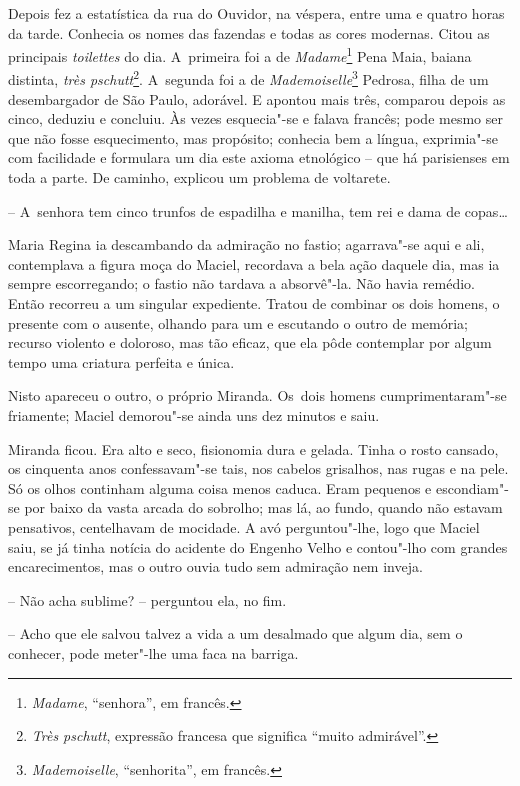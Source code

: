 Depois fez a estatística da rua do Ouvidor, na véspera, entre uma e
quatro horas da tarde. Conhecia os nomes das fazendas e todas as cores
modernas. Citou as principais \emph{toilettes} do dia. A~primeira foi a
de \emph{Madame}\footnote{\emph{Madame}, ``senhora'', em francês.} Pena
Maia, baiana distinta, \emph{très pschutt}\footnote{\emph{Très pschutt},
  expressão francesa que significa ``muito admirável''.}. A~segunda foi
a de \emph{Mademoiselle}\footnote{\emph{Mademoiselle}, ``senhorita'', em
  francês.} Pedrosa, filha de um desembargador de São Paulo, adorável. E
apontou mais três, comparou depois as cinco, deduziu e concluiu. Às
vezes esquecia"-se e falava francês; pode mesmo ser que não fosse
esquecimento, mas propósito; conhecia bem a língua, exprimia"-se com
facilidade e formulara um dia este axioma etnológico -- que há
parisienses em toda a parte. De caminho, explicou um problema de
voltarete.

-- A~senhora tem cinco trunfos de espadilha e manilha, tem rei e dama de
copas\ldots{}

Maria Regina ia descambando da admiração no fastio; agarrava"-se aqui e
ali, contemplava a figura moça do Maciel, recordava a bela ação daquele
dia, mas ia sempre escorregando; o fastio não tardava a absorvê"-la. Não
havia remédio. Então recorreu a um singular expediente. Tratou de
combinar os dois homens, o presente com o ausente, olhando para um e
escutando o outro de memória; recurso violento e doloroso, mas tão
eficaz, que ela pôde contemplar por algum tempo uma criatura perfeita e
única.

Nisto apareceu o outro, o próprio Miranda. Os~dois homens
cumprimentaram"-se friamente; Maciel demorou"-se ainda uns dez minutos e
saiu.

Miranda ficou. Era alto e seco, fisionomia dura e gelada. Tinha o rosto
cansado, os cinquenta anos confessavam"-se tais, nos cabelos grisalhos,
nas rugas e na pele. Só os olhos continham alguma coisa menos caduca.
Eram pequenos e escondiam"-se por baixo da vasta arcada do sobrolho; mas
lá, ao fundo, quando não estavam pensativos, centelhavam de mocidade. A
avó perguntou"-lhe, logo que Maciel saiu, se já tinha notícia do acidente
do Engenho Velho e contou"-lho com grandes encarecimentos, mas o outro
ouvia tudo sem admiração nem inveja.

-- Não acha sublime? -- perguntou ela, no fim.

-- Acho que ele salvou talvez a vida a um desalmado que algum dia, sem o
conhecer, pode meter"-lhe uma faca na barriga.


